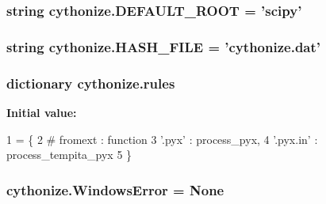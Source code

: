 \subsubsection[{D\+E\+F\+A\+U\+L\+T\+\_\+\+R\+O\+O\+T}]{\setlength{\rightskip}{0pt plus 5cm}string cythonize.\+D\+E\+F\+A\+U\+L\+T\+\_\+\+R\+O\+O\+T = 'scipy'}\label{namespacecythonize_abc1a4ce1c368f8834c6b0957b32787f6}
\hypertarget{namespacecythonize_a006880d3cafc2ebdcff8145cc99a2d5b}{}
\subsubsection[{H\+A\+S\+H\+\_\+\+F\+I\+L\+E}]{\setlength{\rightskip}{0pt plus 5cm}string cythonize.\+H\+A\+S\+H\+\_\+\+F\+I\+L\+E = 'cythonize.\+dat'}\label{namespacecythonize_a006880d3cafc2ebdcff8145cc99a2d5b}
\hypertarget{namespacecythonize_ab8544d028d2837fef869827b5e6e9dfc}{}
\subsubsection[{rules}]{\setlength{\rightskip}{0pt plus 5cm}dictionary cythonize.\+rules}\label{namespacecythonize_ab8544d028d2837fef869827b5e6e9dfc}
{\bfseries Initial value\+:}
\begin{DoxyCode}
1 = \{
2     \textcolor{comment}{# fromext : function}
3     \textcolor{stringliteral}{'.pyx'} : process\_pyx,
4     \textcolor{stringliteral}{'.pyx.in'} : process\_tempita\_pyx
5     \}
\end{DoxyCode}
\hypertarget{namespacecythonize_aa3d92bd79edcc39b70b133ae5c87d58f}{}
\subsubsection[{Windows\+Error}]{\setlength{\rightskip}{0pt plus 5cm}cythonize.\+Windows\+Error = None}\label{namespacecythonize_aa3d92bd79edcc39b70b133ae5c87d58f}
